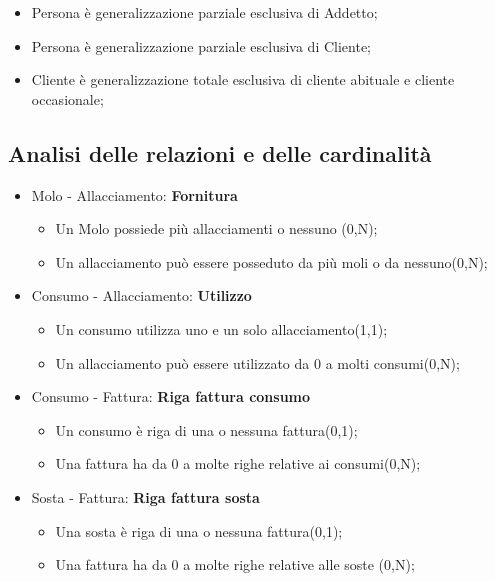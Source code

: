 \begin{itemize}
    \item Persona è generalizzazione parziale esclusiva di Addetto;
    \item Persona è generalizzazione parziale esclusiva di Cliente;
    \item Cliente è generalizzazione totale esclusiva di cliente abituale e cliente occasionale;
\end{itemize}

\subsection{Analisi delle relazioni e delle cardinalità}

\begin{itemize}
    
    \item Molo - Allacciamento: \textbf{Fornitura}
    \begin{itemize}
        \item Un Molo possiede più allacciamenti o nessuno (0,N);
        \item Un allacciamento può essere posseduto da più moli o da nessuno(0,N);
    \end{itemize}

    \item Consumo - Allacciamento: \textbf{Utilizzo}
    \begin{itemize}
        \item Un consumo utilizza uno e un solo allacciamento(1,1);
        \item Un allacciamento può essere utilizzato da 0 a molti consumi(0,N);
    \end{itemize}

    \item Consumo - Fattura: \textbf{Riga fattura consumo}
    \begin{itemize}
        \item Un consumo è riga di una o nessuna fattura(0,1);
        \item Una fattura ha da 0 a molte righe relative ai consumi(0,N);
    \end{itemize}

    \item Sosta - Fattura: \textbf{Riga fattura sosta}
    \begin{itemize}
        \item Una sosta è riga di una o nessuna fattura(0,1);
        \item Una fattura ha da 0 a molte righe relative alle soste (0,N);
    \end{itemize}


\end{itemize}
